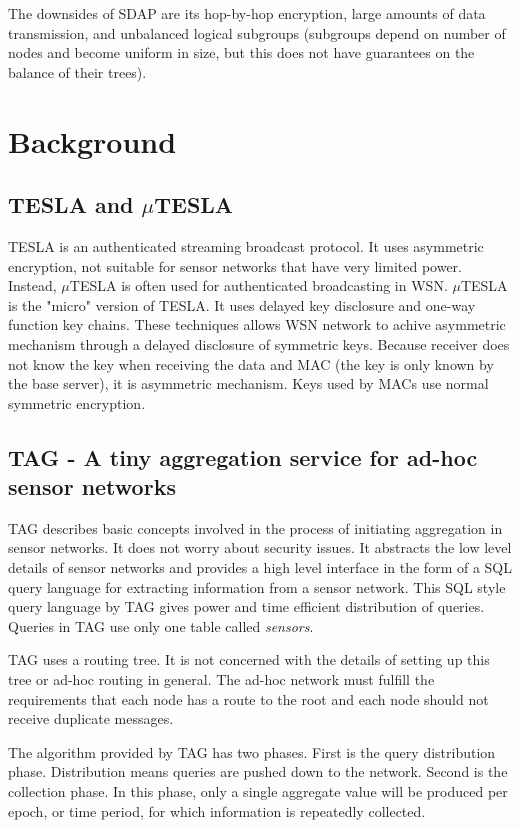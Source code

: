 \documentclass[a4paper]{article}
\begin{document}
The downsides of SDAP are its hop-by-hop encryption, large amounts of
data transmission, and unbalanced logical subgroups (subgroups
depend on number of nodes and become uniform in size, but this does
not have guarantees on the balance of their trees).



\section{Background}
\label{sec:background}
\subsection{TESLA and $\mu$TESLA}

TESLA is an authenticated streaming broadcast protocol. It uses asymmetric
encryption, not suitable for sensor networks that have very limited
power. Instead, $\mu$TESLA is often used for authenticated broadcasting in
WSN. $\mu$TESLA is the "micro" version of TESLA. It uses delayed key
disclosure and one-way function key chains. These techniques allows WSN
network to achive asymmetric mechanism through a delayed disclosure of
symmetric keys. Because receiver does not know the key when receiving the data
and MAC (the key is only known by the base server), it is asymmetric
mechanism. Keys used by MACs use normal symmetric encryption.


\subsection{TAG - A tiny aggregation service for ad-hoc sensor networks}

TAG describes basic concepts involved in the process of initiating aggregation
in sensor networks. It does not worry about security issues. It abstracts the
low level details of sensor networks and provides a high level interface in
the form of a SQL query language for extracting information from a sensor
network. This SQL style query language by TAG gives power and time efficient
distribution of queries. Queries in TAG use only one table called {\em
  sensors}.

TAG uses a routing tree. It is not concerned with the details of setting up
this tree or ad-hoc routing in general. The ad-hoc network must fulfill the
requirements that each node has a route to the root and each node should not
receive duplicate messages.

The algorithm provided by TAG has two phases. First is the query distribution
phase. Distribution means queries are pushed down to the network. Second is
the collection phase. In this phase, only a single aggregate value will be
produced per epoch, or time period, for which information is repeatedly
collected.
\end{document}
